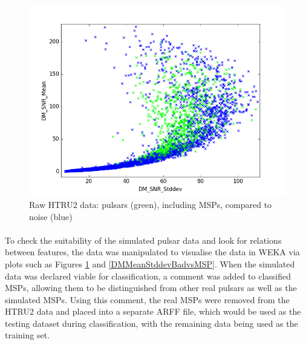 \documentclass[12pt]{article}
\begin{document}
\begin{figure}[h!]
\begin{center}
\includegraphics[scale=0.5]{HTRU2_noise(b)_psr(g)_dm_mean_vs_stddev.png}
\caption{Raw HTRU2 data: pulsars (green), including MSPs, compared to noise (blue)}
\label{HTRU2noisepsr}
\end{center}
\end{figure}

\paragraph{}
To check the suitability of the simulated pulsar data and look for relations between features, the data was manipulated to visualise the data in WEKA via plots such as Figures \ref{HTRU2noisepsr} and \ref{DMMeanStddevBadvsMSP}. When the simulated data was declared viable for classification, a comment was added to classified MSPs, allowing them to be distinguished from other real pulsars as well as the simulated MSPs. Using this comment, the real MSPs were removed from the HTRU2 data and placed into a separate ARFF file, which would be used as the testing dataset during classification, with the remaining data being used as the training set.
\end{document}
